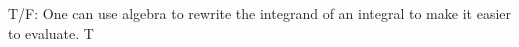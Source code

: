 {T/F: One can use algebra to rewrite the integrand of an integral to make it easier to evaluate.
}
{T
}

